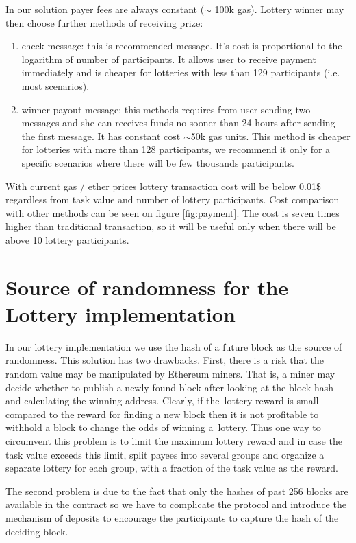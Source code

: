 \documentclass[a4paper]{article}
\begin{document}
    In our solution payer fees are always constant ($\sim$ 100k gas).
    Lottery winner may then choose further methods of receiving prize:
    \begin{enumerate}
        \item check message: this is recommended message. It's cost is proportional to the logarithm of number of
            participants. It allows user to receive payment immediately and is cheaper for lotteries with less than 129
            participants (i.e. most scenarios).
        \item winner-payout message: this methods requires from user sending two messages and she can receives funds no
            sooner than 24 hours after sending the first message. It has constant cost $\sim$50k gas units.
            This method is cheaper for lotteries with more than 128 participants, we recommend it only for a specific
            scenarios where there will be few thousands participants.
    \end{enumerate}

    With current gas / ether prices lottery transaction cost will be below 0.01\$ regardless from task value and number
    of lottery participants. Cost comparison with other methods can be seen on figure \ref{fig:payment}.
    The cost is seven times higher than traditional transaction, so it will be useful only  when there will be above
    10 lottery participants.

\section{Source of randomness for the Lottery implementation}
\label{sec:randomness}
    In our lottery implementation we use the hash of a future block as the source of randomness. This solution has
    two drawbacks. First, there is a risk that the random value may be manipulated by Ethereum miners. That is,
    a miner may decide whether to publish a newly found block after looking at the block hash and calculating
    the winning address. Clearly, if the~lottery reward is small compared to the reward for finding a new block
    then it is not profitable to withhold a block to change the odds of winning a~lottery. Thus one way to circumvent
    this problem is to limit the maximum lottery reward and in case the task value exceeds this limit, split payees
    into several groups and organize a separate lottery for each group, with a fraction of the task value as the
    reward.

    The second problem is due to the fact that only the hashes of past 256 blocks are available in the contract
    so we have to complicate the protocol and introduce the mechanism of deposits to encourage the participants
    to capture the hash of the deciding block.
\end{document}
